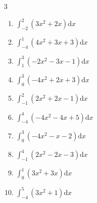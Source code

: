 \begin{multicols}{3}
\begin{enumerate}
  \item $\displaystyle \int_{-2}^{2}\left( 3x^{2}+2x \right) \mathrm{d}x$

        \phantom{$\displaystyle =16$}

\columnbreak %

  \item $\displaystyle \int_{-4}^{1}\left( 4x^{2}+3x+3 \right) \mathrm{d}x$


  \item $\displaystyle \int_{1}^{3}\left( -2x^{2}-3x-1 \right) \mathrm{d}x$


  \item $\displaystyle \int_{0}^{3}\left( -4x^{2}+2x+3 \right) \mathrm{d}x$


  \item $\displaystyle \int_{-1}^{2}\left( 2x^{2}+2x-1 \right) \mathrm{d}x$


  \item $\displaystyle \int_{-4}^{4}\left( -4x^{2}-4x+5 \right) \mathrm{d}x$

        \phantom{$\displaystyle =-164$}

\columnbreak %

\resetques

  \item $\displaystyle \int_{0}^{3}\left( -4x^{2}-x-2 \right) \mathrm{d}x$


  \item $\displaystyle \int_{-1}^{4}\left( 2x^{2}-2x-3 \right) \mathrm{d}x$


  \item $\displaystyle \int_{0}^{1}\left( 3x^{2}+3x \right) \mathrm{d}x$


  \item $\displaystyle \int_{-4}^{5}\left( 3x^{2}+1 \right) \mathrm{d}x$



\end{enumerate}
\end{multicols}
